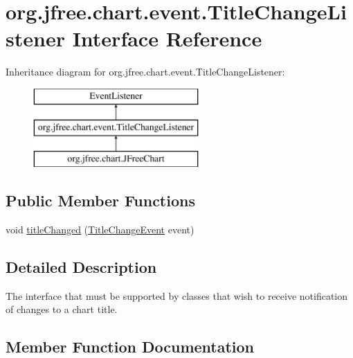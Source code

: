 \hypertarget{interfaceorg_1_1jfree_1_1chart_1_1event_1_1_title_change_listener}{}\section{org.\+jfree.\+chart.\+event.\+Title\+Change\+Listener Interface Reference}
\label{interfaceorg_1_1jfree_1_1chart_1_1event_1_1_title_change_listener}
Inheritance diagram for org.\+jfree.\+chart.\+event.\+Title\+Change\+Listener\+:\begin{figure}[H]
\begin{center}
\leavevmode
\includegraphics[height=3.000000cm]{interfaceorg_1_1jfree_1_1chart_1_1event_1_1_title_change_listener}
\end{center}
\end{figure}
\subsection*{Public Member Functions}
\begin{DoxyCompactItemize}
\item 
void \mbox{\hyperlink{interfaceorg_1_1jfree_1_1chart_1_1event_1_1_title_change_listener_ad990e311129ba6f5500b44bb0e132cec}{title\+Changed}} (\mbox{\hyperlink{classorg_1_1jfree_1_1chart_1_1event_1_1_title_change_event}{Title\+Change\+Event}} event)
\end{DoxyCompactItemize}


\subsection{Detailed Description}
The interface that must be supported by classes that wish to receive notification of changes to a chart title. 

\subsection{Member Function Documentation}
\mbox{\label{interfaceorg_1_1jfree_1_1chart_1_1event_1_1_title_change_listener_ad990e311129ba6f5500b44bb0e132cec}} 
